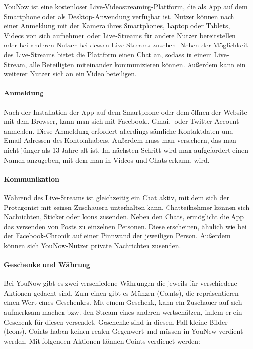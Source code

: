 YouNow ist eine kostenloser Live-Videostreaming-Plattform, die als App auf dem Smartphone oder als Desktop-Anwendung verfügbar ist. Nutzer können nach einer Anmeldung mit der Kamera ihres Smartphones, Laptop oder Tablets, Videos von sich aufnehmen oder Live-Streams für andere Nutzer bereitstellen oder bei anderen Nutzer bei dessen Live-Streams zusehen. Neben der Möglichkeit des Live-Streams bietet die Plattform einen Chat an, sodass in einem Live-Stream, alle Beteiligten miteinander kommunizieren können. Außerdem kann ein weiterer Nutzer sich an ein Video beteiligen. 

\paragraph{Anmeldung}
Nach der Installation der App auf dem Smartphone oder dem öffnen der Website mit dem Browser, kann man sich mit Facebook,. Gmail- oder Twitter-Account anmelden. Diese Anmeldung erfordert allerdings sämliche Kontaktdaten und Email-Adressen des Kontoinhabers. Außerdem muss man versichern, das man nicht jünger als 13 Jahre alt ist.
Im nächsten Schritt wird man aufgefordert einen Namen anzugeben, mit dem man in Videos und Chats erkannt wird.

\paragraph{Kommunikation}
Während des Live-Streams ist gleichzeitig ein Chat aktiv, mit dem sich der Protagonist mit seinen Zuschauern unterhalten kann. Chatteilnehmer können sich Nachrichten, Sticker oder Icons zusenden. Neben den Chats, ermöglicht die App das versenden von Posts zu einzelnen Personen. Diese erscheinen, ähnlich wie bei der Facebook-Chronik auf einer Pinnwand der jeweiligen Person. Außerdem können sich YouNow-Nutzer private Nachrichten zusenden.


\paragraph{Geschenke und Währung}
Bei YouNow gibt es zwei verschiedene Währungen die jeweils für verschiedene Aktionen gedacht sind. Zum einen gibt es Münzen (Coints), die repräsentieren einen Wert eines Geschenkes. Mit einem Geschenk, kann ein Zuschauer auf sich aufmerksam machen bzw. den Stream eines anderen wertschätzen, indem er ein Geschenk für diesen versendet. Geschenke sind in diesem Fall kleine Bilder (Icons).
Coints haben keinen realen Gegenwert und müssen in YouNow verdient werden. Mit folgenden Aktionen können Coints verdienet werden:

